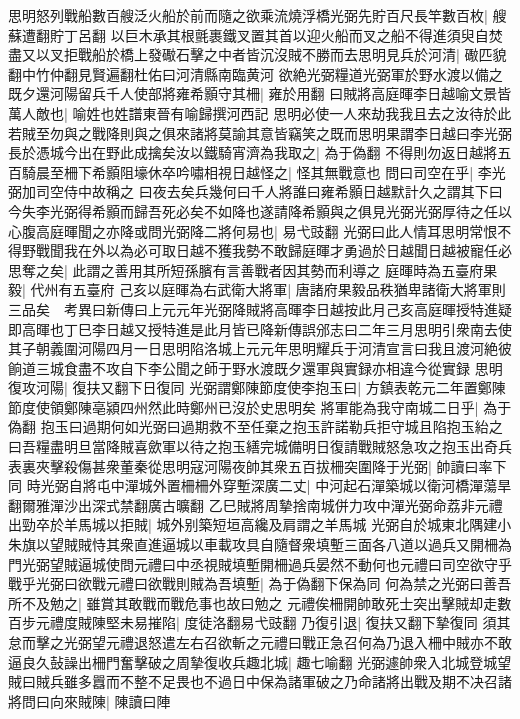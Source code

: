 思明怒列戰船數百艘泛火船於前而隨之欲乘流燒浮橋光弼先貯百尺長竿數百枚|{
	艘蘇遭翻貯丁呂翻}
以巨木承其根氈裹鐵叉置其首以迎火船而叉之船不得進須臾自焚盡又以叉拒戰船於橋上發礮石擊之中者皆沉沒賊不勝而去思明見兵於河清|{
	礮匹貌翻中竹仲翻見賢遍翻杜佑曰河清縣南臨黄河}
欲絶光弼糧道光弼軍於野水渡以備之既夕還河陽留兵千人使部將雍希顥守其柵|{
	雍於用翻}
曰賊將高庭暉李日越喻文景皆萬人敵也|{
	喻姓也姓譜東晉有喻歸撰河西記}
思明必使一人來劫我我且去之汝待於此若賊至勿與之戰降則與之俱來諸將莫諭其意皆竊笑之既而思明果謂李日越曰李光弼長於憑城今出在野此成擒矣汝以鐵騎宵濟為我取之|{
	為于偽翻}
不得則勿返日越將五百騎晨至柵下希顥阻壕休卒吟嘯相視日越怪之|{
	怪其無戰意也}
問曰司空在乎|{
	李光弼加司空侍中故稱之}
曰夜去矣兵幾何曰千人將誰曰雍希顥日越默計久之謂其下曰今失李光弼得希顥而歸吾死必矣不如降也遂請降希顥與之俱見光弼光弼厚待之任以心腹高庭暉聞之亦降或問光弼降二將何易也|{
	易弋豉翻}
光弼曰此人情耳思明常恨不得野戰聞我在外以為必可取日越不獲我勢不敢歸庭暉才勇過於日越聞日越被寵任必思奪之矣|{
	此謂之善用其所短孫臏有言善戰者因其勢而利導之}
庭暉時為五臺府果毅|{
	代州有五臺府}
己亥以庭暉為右武衛大將軍|{
	唐諸府果毅品秩猶卑諸衛大將軍則三品矣　考異曰新傳曰上元元年光弼降賊將高暉李日越按此月己亥高庭暉授特進疑即高暉也丁巳李日越又授特進是此月皆已降新傳誤邠志曰二年三月思明引衆南去使其子朝義圍河陽四月一日思明陷洛城上元元年思明耀兵于河清宣言曰我且渡河絶彼餉道三城食盡不攻自下李公聞之師于野水渡既夕還軍與實録亦相違今從實録}
思明復攻河陽|{
	復扶又翻下日復同}
光弼謂鄭陳節度使李抱玉曰|{
	方鎮表乾元二年置鄭陳節度使領鄭陳亳潁四州然此時鄭州已沒於史思明矣}
將軍能為我守南城二日乎|{
	為于偽翻}
抱玉曰過期何如光弼曰過期救不至任棄之抱玉許諾勒兵拒守城且陷抱玉紿之曰吾糧盡明旦當降賊喜歛軍以待之抱玉繕完城備明日復請戰賊怒急攻之抱玉出奇兵表裏夾擊殺傷甚衆董秦從思明寇河陽夜帥其衆五百拔柵突圍降于光弼|{
	帥讀曰率下同}
時光弼自將屯中潬城外置柵柵外穿塹深廣二丈|{
	中河起石潬築城以衛河橋潬蕩旱翻爾雅潬沙出深式禁翻廣古曠翻}
乙巳賊將周摯捨南城併力攻中潬光弼命荔非元禮出勁卒於羊馬城以拒賊|{
	城外别築短垣高纔及肩謂之羊馬城}
光弼自於城東北隅建小朱旗以望賊賊恃其衆直進逼城以車載攻具自隨督衆填塹三面各八道以過兵又開柵為門光弼望賊逼城使問元禮曰中丞視賊填塹開柵過兵晏然不動何也元禮曰司空欲守乎戰乎光弼曰欲戰元禮曰欲戰則賊為吾填塹|{
	為于偽翻下保為同}
何為禁之光弼曰善吾所不及勉之|{
	雖賞其敢戰而戰危事也故曰勉之}
元禮俟柵開帥敢死士突出擊賊却走數百步元禮度賊陳堅未易摧陷|{
	度徒洛翻易弋豉翻}
乃復引退|{
	復扶又翻下摯復同}
須其怠而擊之光弼望元禮退怒遣左右召欲斬之元禮曰戰正急召何為乃退入柵中賊亦不敢逼良久鼔譟出柵門奮擊破之周摯復收兵趣北城|{
	趣七喻翻}
光弼遽帥衆入北城登城望賊曰賊兵雖多囂而不整不足畏也不過日中保為諸軍破之乃命諸將出戰及期不决召諸將問曰向來賊陳|{
	陳讀曰陣}
